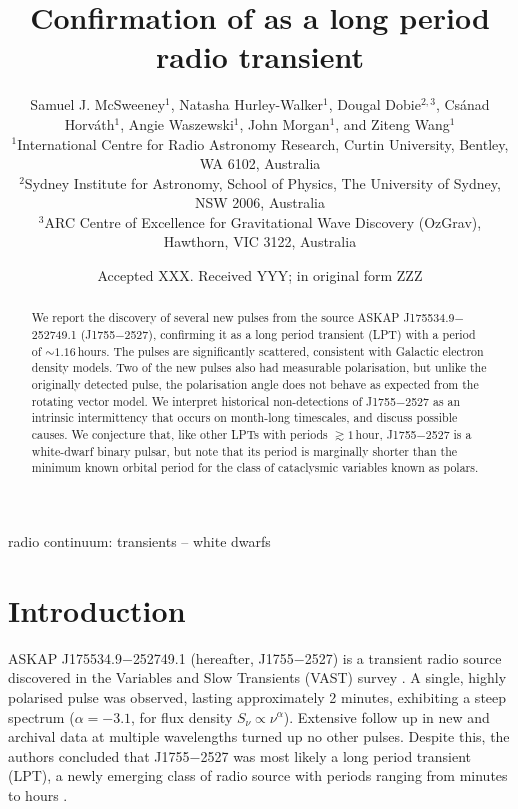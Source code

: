 \documentclass[fleqn,usenatbib]{mnras}
\title[Confirmation of \src{} as LPT]{Confirmation of \srcfull{} as a long period radio transient}
\author[S. J. McSweeney et al.]{
Samuel J. McSweeney$^{1}$,
Natasha Hurley-Walker$^{1}$,
Dougal Dobie$^{2,3}$,
Cs\'{a}nad Horv\'{a}th$^{1}$,
\newauthor
Angie Waszewski$^{1}$,
John Morgan$^{1}$,
and Ziteng Wang$^{1}$
\\
$^{1}$International Centre for Radio Astronomy Research, Curtin University, Bentley, WA 6102, Australia\\
$^{2}$Sydney Institute for Astronomy, School of Physics, The University of Sydney, NSW 2006, Australia\\
$^{3}$ARC Centre of Excellence for Gravitational Wave Discovery (OzGrav), Hawthorn, VIC 3122, Australia
}
\date{Accepted XXX. Received YYY; in original form ZZZ}
\newcommand{\src}{J1755$-$2527}
\newcommand{\srcfull}{ASKAP J175534.9$-$252749.1}
\begin{document}
\label{firstpage}
\pagerange{\pageref{firstpage}--\pageref{lastpage}}
\maketitle

\begin{abstract}
We report the discovery of several new pulses from the source \srcfull{} (\src{}), confirming it as a long period transient (LPT) with a period of ${\sim}1.16\,$hours. The pulses are significantly scattered, consistent with Galactic electron density models. Two of the new pulses also had measurable polarisation, but unlike the originally detected pulse, the polarisation angle does not behave as expected from the rotating vector model. We interpret historical non-detections of \src{} as an intrinsic intermittency that occurs on month-long timescales, and discuss possible causes. We conjecture that, like other LPTs with periods $\gtrsim 1\,$hour, \src{} is a white-dwarf binary pulsar, but note that its period is marginally shorter than the minimum known orbital period for the class of cataclysmic variables known as polars.
\end{abstract}

\begin{keywords}
radio continuum: transients -- white dwarfs
\end{keywords}



\section{Introduction} \label{sec:introduction}

\srcfull{} (hereafter, \src{}) is a transient radio source discovered in the Variables and Slow Transients (VAST) survey \citep[][hereafter ]{2024MNRAS.535..909D}.
A single, highly polarised pulse was observed, lasting approximately 2 minutes, exhibiting a steep spectrum ($\alpha = -3.1$, for flux density $S_\nu\propto\nu^\alpha$).
Extensive follow up in new and archival data at multiple wavelengths turned up no other pulses.
Despite this, the authors concluded that \src{} was most likely a long period transient (LPT), a newly emerging class of radio source with periods ranging from minutes to hours \citep[see e.g.][]{2022Natur.601..526H,2023Natur.619..487H,2024NatAs...8.1159C}.
\end{document}
